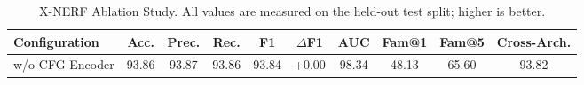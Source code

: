 \begin{table}[t]
\caption{X-NERF Ablation Study. All values are measured on the held-out test split; higher is better.}
\label{tab:ablation}
\centering
\scriptsize
\setlength{\tabcolsep}{3pt}
\begin{tabular}{lccccccccc}
\toprule
\textbf{Configuration} & \textbf{Acc.} & \textbf{Prec.} & \textbf{Rec.} & \textbf{F1} & \textbf{$\Delta$F1} & \textbf{AUC} & \textbf{Fam@1} & \textbf{Fam@5} & \textbf{Cross-Arch.} \\
\midrule
w/o CFG Encoder & 93.86 & 93.87 & 93.86 & 93.84 & +0.00 & 98.34 & 48.13 & 65.60 & 93.82 \\
\bottomrule
\end{tabular}
\end{table}
